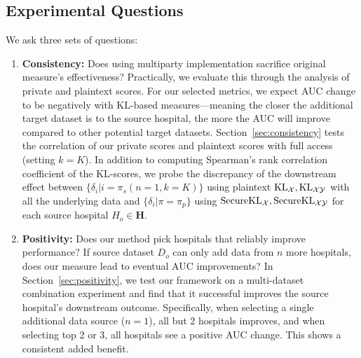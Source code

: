 \subsection{Experimental Questions}
We ask three sets of questions:
\begin{enumerate}
\item \textbf{Consistency:} Does using multiparty implementation sacrifice original measure's effectiveness?  
Practically, we evaluate this through the analysis of private and plaintext scores. For our selected metrics, we expect AUC change to be negatively with KL-based measures---meaning the closer the additional target dataset is to the source hospital, the more the AUC will improve compared to other potential target datasets.
Section~\ref{sec:consistency} tests the correlation of our private scores and plaintext scores with full access (setting $k=K$). In addition to computing Spearman's rank correlation coefficient of the KL-scores, we probe the discrepancy of the downstream effect between  $\{\delta_i|i=\pi_s(n=1, k=K)\}$ using plaintext $\mathrm{KL}_\mathcal{X}, \mathrm{KL}_{\mathcal{X}\mathcal{Y}}$ with all the underlying data and $\{\delta_i|\pi=\pi_p\}$ using $\mathrm{Secure}\mathrm{KL}_\mathcal{X}, \mathrm{Secure}\mathrm{KL}_{\mathcal{X}\mathcal{Y}}$ for each source hospital $H_o\in \mathbf{H}$.
\item \textbf{Positivity:}
Does our method pick hospitals that reliably improve performance? If source dataset $D_o$ can only add data from $n$ more hospitals, does our measure lead to eventual AUC improvements?
In Section~\ref{sec:positivity}, we test our framework on a multi-dataset combination experiment and find that it successful improves the source hospital's downstream outcome. Specifically, when selecting a single additional data source ($n=1$), all but 2 hospitals improves, and when selecting top 2 or 3, all hospitals see a positive AUC change. This shows a consistent added benefit.


\end{enumerate}
